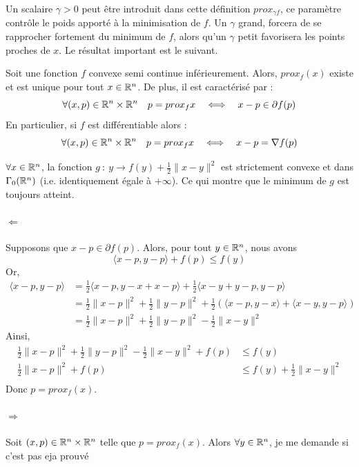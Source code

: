 \documentclass[a4paper,12pt]{article}
\begin{document}
Un scalaire $\gamma >0 $ peut être introduit dans cette définition $prox_{\gamma f}$, ce paramètre contrôle le poids apporté à la minimisation de $f$. Un $\gamma$ grand, forcera de se rapprocher fortement du minimum de $f$, alors qu'un $\gamma$ petit favorisera les points proches de $x$. Le résultat important est le suivant. 
\begin{propriete}
Soit une fonction $f$ convexe semi continue inférieurement. Alors, $prox_f(x)$ existe et est unique pour tout $x\in\mathbb{R}^n$. De plus, il est caractérisé par : 
$$
\forall (x,p)\in \mathbb{R}^n\times\mathbb{R}^n\quad p=prox_fx\quad\Longleftrightarrow\quad x-p\in\partial f(p)
$$
En particulier, si $f$ est différentiable alors : 
$$
\forall (x,p)\in \mathbb{R}^n\times\mathbb{R}^n\quad p=prox_fx\quad \Longleftrightarrow \quad x-p=\nabla f(p)
$$
\end{propriete}
\begin{preuve}
$\forall x \in \mathbb{R}^n$, la fonction $g\ :\ y \rightarrow f(y) +\frac{1}{2}\|x-y\|^2$ est strictement convexe et dans $\Gamma_0(\mathbb{R}^n)$ (i.e. identiquement égale à $+\infty$). Ce qui montre que le minimum de $g$ est toujours atteint. 


\paragraph{$\Leftarrow$} Supposons que $x-p\in\partial f(p)$. Alors, pour tout $y\in\mathbb{R}^n$, nous avons 
$$
\langle x-p,y-p\rangle +f(p) \leq f(y)
$$
Or,
\begin{align*}
\langle x-p,y-p\rangle &= \frac{1}{2}\langle x-p,y-x+x-p\rangle + \frac{1}{2}\langle  x-y+y-p,y-p\rangle\\
&=\frac{1}{2} \|x-p\|^2 + \frac{1}{2}\|y-p \|^2 +\frac{1}{2}\left( \langle x-p,y-x\rangle + \langle x-y,y-p\rangle\right)\\
&= \frac{1}{2} \|x-p\|^2 + \frac{1}{2}\|y-p \|^2 -\frac{1}{2}\|x-y\|^2
\end{align*}
Ainsi,
\begin{align*}
\frac{1}{2} \|x-p\|^2 + \frac{1}{2}\|y-p \|^2 -\frac{1}{2}\|x-y\|^2 + f(p) &\leq f(y) \\
\frac{1}{2} \|x-p\|^2 + f(p) &\leq f(y) + \frac{1}{2}\|x-y\|^2\\
\end{align*}
Donc $p=prox_f(x)$.
\paragraph{$\Rightarrow$} Soit $(x,p)\in \mathbb{R}^n\times\mathbb{R}^n$ telle que $p=prox_f(x)$. Alors $\forall y\in\mathbb{R}^n$,
{\Huge je me demande si c'est pas eja prouvé}
\end{preuve}
 
\end{document}
